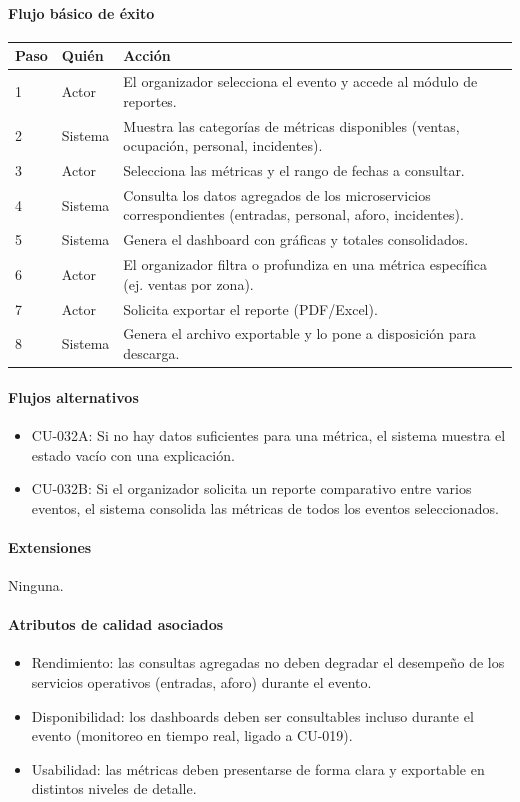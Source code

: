 \paragraph{Flujo básico de éxito}
\begin{longtable}{P{1.1cm}P{1.8cm}P{10.5cm}}
\toprule
\textbf{Paso} & \textbf{Quién} & \textbf{Acción}\\
\midrule
{} & Actor & El organizador selecciona el evento y accede al módulo de reportes.\\
2 & Sistema & Muestra las categorías de métricas disponibles (ventas, ocupación, personal, incidentes).\\
3 & Actor & Selecciona las métricas y el rango de fechas a consultar.\\
4 & Sistema & Consulta los datos agregados de los microservicios correspondientes (entradas, personal, aforo, incidentes).\\
5 & Sistema & Genera el dashboard con gráficas y totales consolidados.\\
6 & Actor & El organizador filtra o profundiza en una métrica específica (ej. ventas por zona).\\
7 & Actor & Solicita exportar el reporte (PDF/Excel).\\
8 & Sistema & Genera el archivo exportable y lo pone a disposición para descarga.\\
\bottomrule
\end{longtable}

\paragraph{Flujos alternativos}
\begin{itemize}[leftmargin=1.4em, topsep=1pt]
  \item CU-032A: Si no hay datos suficientes para una métrica, el sistema muestra el estado vacío con una explicación.
  \item CU-032B: Si el organizador solicita un reporte comparativo entre varios eventos, el sistema consolida las métricas de todos los eventos seleccionados.
\end{itemize}

\paragraph{Extensiones}
Ninguna.

\paragraph{Atributos de calidad asociados}
\begin{itemize}[leftmargin=1.4em, topsep=1pt]
  \item Rendimiento: las consultas agregadas no deben degradar el desempeño de los servicios operativos (entradas, aforo) durante el evento.
  \item Disponibilidad: los dashboards deben ser consultables incluso durante el evento (monitoreo en tiempo real, ligado a CU-019).
  \item Usabilidad: las métricas deben presentarse de forma clara y exportable en distintos niveles de detalle.
\end{itemize}

